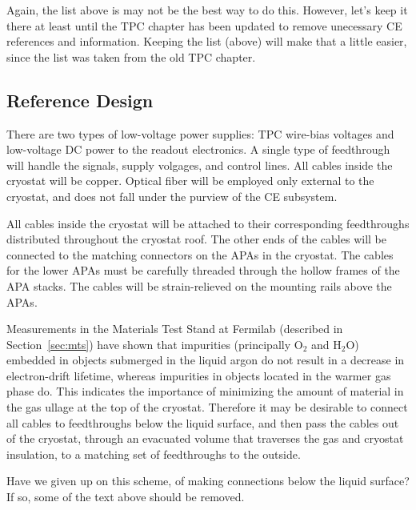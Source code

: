 \begin{editornote}
  Again, the list above is may not be the best way to do this.
  However, let's keep it there at least until the TPC chapter has been
  updated to remove unecessary CE references and information.
  Keeping the list (above) will make that a little easier, since the list was taken from the old TPC chapter.
\end{editornote}


\subsection{Reference Design} 
\label{subsec:ce-feedthru-desc}

There are two types of low-voltage power supplies:
TPC wire-bias voltages and low-voltage DC power to the readout electronics.
A single type of feedthrough will handle the signals, supply volgages, and control lines.
All cables inside the cryostat will be copper.
Optical fiber will be employed only external to the cryostat, and does not fall under the purview of the CE subsystem.

All cables inside the cryostat will be attached to their corresponding feedthroughs distributed throughout the cryostat roof.
The other ends of the cables will be connected to the matching connectors on the APAs in the cryostat.
The cables for the lower APAs must be carefully threaded through the hollow frames of the APA stacks.
The cables will be strain-relieved on the  mounting rails above the APAs. 

Measurements in the Materials Test Stand at Fermilab (described in Section~\ref{sec:mts})
have shown that impurities (principally O$_2$ and H$_2$O) embedded in objects submerged in the liquid argon do not result
in a decrease in electron-drift lifetime, whereas impurities in objects located in the warmer gas phase do.
This indicates the importance of minimizing the amount of material in the gas ullage at the top of the cryostat.
Therefore it may be desirable to connect all cables to feedthroughs below the liquid surface,
and then pass the cables out of the cryostat, through an evacuated volume that traverses the gas and cryostat insulation,
to a matching set of feedthroughs to the outside. 

\begin{editornote}
  Have we given up on this scheme, of making connections below the liquid surface?
  If so, some of the text above should be removed.
\end{editornote}


